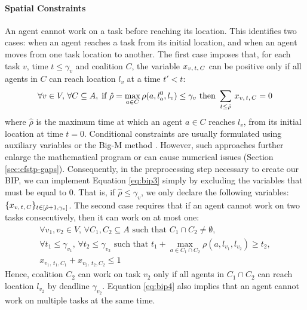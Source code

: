 \paragraph{Spatial Constraints}

An agent cannot work on a task before reaching its location. This identifies two cases:
when an agent reaches a task from its initial location, and when an agent moves from one
task location to another. The first case imposes that, for each task $v$, time $t \leq
\gamma_v$ and coalition $C$, the variable $x_{v,\, t,\, C}$ can be positive only if all agents in $C$
can reach location $l_v$ at a time $t' < t$:
\begin{equation}\label{eq:bip3}
    \forall v \in V,\, \forall C \subseteq A,\;
    \text{if } \hat{\rho} = \max_{a \in C} \rho(a, l_a^0, l_v) \leq \gamma_v
    \text{ then }
    \sum_{t \leq \hat{\rho}}\, x_{v,\, t,\, C} = 0
\end{equation}
where $\hat{\rho}$ is the maximum time at which an agent $a \in C$ reaches $l_v$, from its
initial location at time $t = 0$. Conditional constraints are usually formulated using
auxiliary variables or the Big-M method \cite{wolsey2020}.
However, such approaches further enlarge the mathematical program or can cause numerical
issues (Section \ref{sec:cfstp-gaps}). Consequently, in the preprocessing step necessary
to create our BIP, we can implement Equation \ref{eq:bip3} simply by excluding the
variables that must be equal to $0$. That is, if $\hat{\rho} \leq \gamma_v$, we only
declare the following variables: $\{ x_{v,\, t,\, C} \}_{t \in [\hat{\rho} + 1, \gamma_v]}$.
The second case requires that if an agent cannot work on two tasks consecutively, then it
can work on at most one:
\begin{equation}\label{eq:bip4}
    \begin{gathered}
    \forall v_1, v_2 \in V,\,
    \forall C_1, C_2 \subseteq A \text{ such that } C_1 \cap C_2 \neq \emptyset,\\
    \forall t_1 \leq \gamma_{v_1},\, \forall t_2 \leq \gamma_{v_2} \text{ such that }
    t_1 + \max_{a \in C_1 \cap C_2} \rho(a, l_{v_1}, l_{v_2}) \geq t_2,\\
    x_{v_1,\, t_1, C_1} + x_{v_2,\, t_2, C_2} \leq 1
    \end{gathered}
\end{equation}
Hence, coalition $C_2$ can work on task $v_2$ only if all agents in $C_1 \cap C_2$ can
reach location $l_{v_2}$ by deadline $\gamma_{v_2}$. Equation \ref{eq:bip4} also implies
that an agent cannot work on multiple tasks at the same time.

